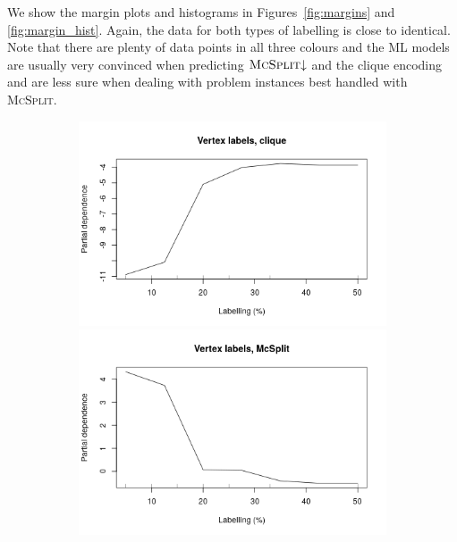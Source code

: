 \documentclass{l4proj}
\theoremstyle{definition}
\theoremstyle{remark}
\begin{document}
We show the margin plots and histograms in Figures~\ref{fig:margins} and
\ref{fig:margin_hist}. Again, the data for both types of labelling is close to
identical. Note that there are plenty of data points in all three colours and the ML
models are usually very convinced when predicting $\textsc{McSplit}{\downarrow}$
and the clique encoding and are less sure when dealing with problem instances
best handled with \textsc{McSplit}.

\begin{figure}
  \centering
  \begin{subfigure}[t]{0.49\textwidth}
    \centering
    \includegraphics[width=\textwidth]{images/vertex_labels_clique_labelling.png}
    \includegraphics[width=\textwidth]{images/vertex_labels_mcsplit_labelling.png}

\end{subfigure}
\end{figure}
\end{document}
